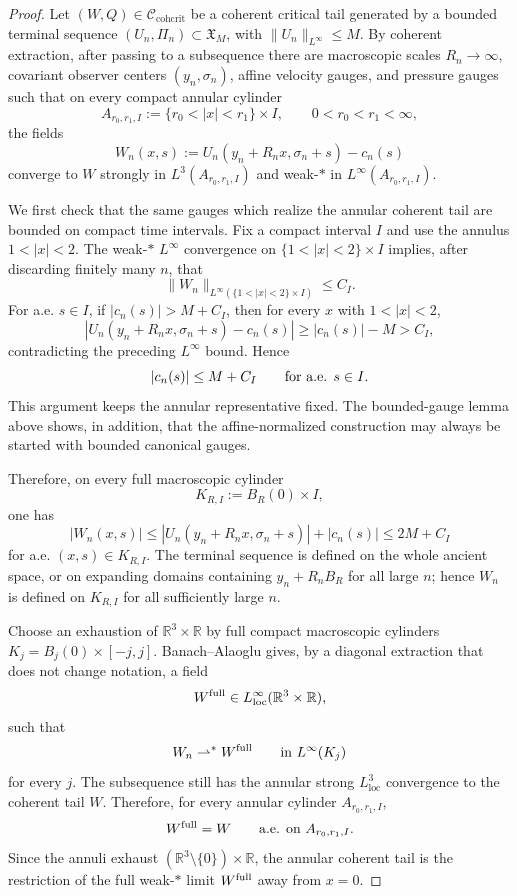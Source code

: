 \documentclass[11pt]{amsart}
\numberwithin{equation}{section}
\theoremstyle{plain}
\theoremstyle{definition}
\theoremstyle{remark}
\newcommand{\loc}{\mathrm{loc}}
\newcommand{\Ccohcrit}{\mathcal C_{\mathrm{cohcrit}}}
\begin{document}
\begin{proof}
Let \((W,Q)\in\Ccohcrit\) be a coherent critical tail generated by a bounded
terminal sequence \((U_n,\Pi_n)\subset\mathfrak X_M\), with
\(\|U_n\|_{L^\infty}\le M\).  By coherent extraction, after passing to a
subsequence there are macroscopic scales \(R_n\to\infty\), covariant observer
centers \((y_n,\sigma_n)\), affine velocity gauges, and pressure gauges such
that on every compact annular cylinder
\[
   A_{r_0,r_1,I}:=\{r_0<|x|<r_1\}\times I,
   \qquad 0<r_0<r_1<\infty,
\]
the fields
\[
   W_n(x,s):=U_n(y_n+R_nx,\sigma_n+s)-c_n(s)
\]
converge to \(W\) strongly in \(L^3(A_{r_0,r_1,I})\) and weak-\(*\) in
\(L^\infty(A_{r_0,r_1,I})\).

We first check that the same gauges which realize the annular coherent tail are
bounded on compact time intervals.  Fix a compact interval \(I\) and use the
annulus \(1<|x|<2\).  The weak-\(*\) \(L^\infty\) convergence on
\(\{1<|x|<2\}\times I\) implies, after discarding finitely many \(n\), that
\[
   \|W_n\|_{L^\infty(\{1<|x|<2\}\times I)}\le C_I .
\]
For a.e. \(s\in I\), if \(|c_n(s)|>M+C_I\), then for every
\(x\) with \(1<|x|<2\),
\[
   |U_n(y_n+R_nx,\sigma_n+s)-c_n(s)|
   \ge |c_n(s)|-M>C_I,
\]
contradicting the preceding \(L^\infty\) bound.  Hence
\[
   |c_n(s)|\le M+C_I
   \qquad\hbox{for a.e. }s\in I .
\]
This argument keeps the annular representative fixed.  The bounded-gauge lemma
above shows, in addition, that the affine-normalized construction may always be
started with bounded canonical gauges.

Therefore, on every full macroscopic cylinder
\[
   K_{R,I}:=B_R(0)\times I,
\]
one has
\[
   |W_n(x,s)|
   \le |U_n(y_n+R_nx,\sigma_n+s)|+|c_n(s)|
   \le 2M+C_I
\]
for a.e. \((x,s)\in K_{R,I}\).  The terminal sequence is defined on the whole
ancient space, or on expanding domains containing \(y_n+R_nB_R\) for all large
\(n\); hence \(W_n\) is defined on \(K_{R,I}\) for all sufficiently large
\(n\).

Choose an exhaustion of \(\mathbb R^3\times\mathbb R\) by full compact
macroscopic cylinders \(K_j=B_j(0)\times[-j,j]\).  Banach--Alaoglu gives, by a
diagonal extraction that does not change notation, a field
\[
   W^{\rm full}\in L^\infty_{\loc}(\mathbb R^3\times\mathbb R),
\]
such that
\[
   W_n\rightharpoonup^\ast W^{\rm full}
   \qquad\hbox{in }L^\infty(K_j)
\]
for every \(j\).  The subsequence still has the annular strong
\(L^3_{\loc}\) convergence to the coherent tail \(W\).  Therefore, for every
annular cylinder \(A_{r_0,r_1,I}\),
\[
   W^{\rm full}=W
   \qquad\hbox{a.e. on }A_{r_0,r_1,I}.
\]
Since the annuli exhaust
\((\mathbb R^3\setminus\{0\})\times\mathbb R\), the annular coherent tail is the
restriction of the full weak-\(*\) limit \(W^{\rm full}\) away from \(x=0\).


\end{proof}
\end{document}
